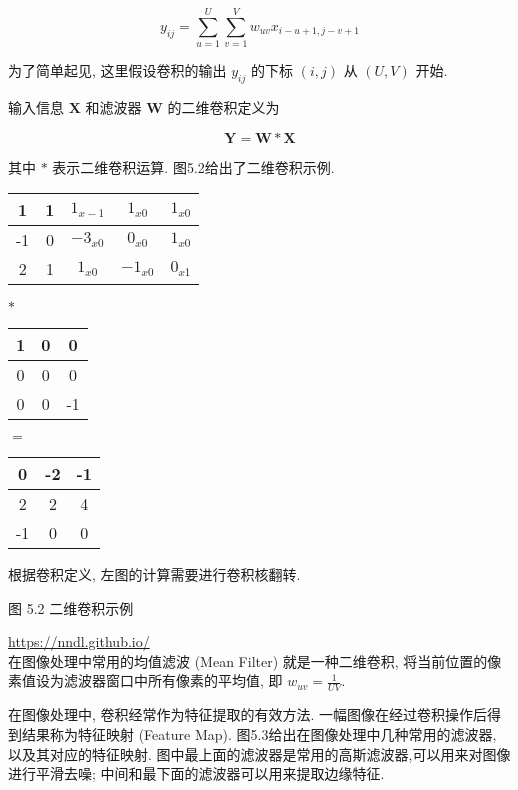 \documentclass[10pt]{article}
\begin{document}
\begin{equation*}
y_{i j}=\sum_{u=1}^{U} \sum_{v=1}^{V} w_{u v} x_{i-u+1, j-v+1} \tag{5.7}
\end{equation*}


为了简单起见, 这里假设卷积的输出 $y_{i j}$ 的下标 $(i, j)$ 从 $(U, V)$ 开始.

输入信息 $\boldsymbol{X}$ 和滤波器 $\boldsymbol{W}$ 的二维卷积定义为


\begin{equation*}
\boldsymbol{Y}=\boldsymbol{W} * \boldsymbol{X} \tag{5.8}
\end{equation*}


其中 $*$ 表示二维卷积运算. 图5.2给出了二维卷积示例.

\begin{center}
\begin{tabular}{|c|c|c|c|c|}
\hline
1 & 1 & $1_{x-1}$ & $1_{x 0}$ & $1_{x 0}$ \\
\hline
-1 & 0 & $-3_{x 0}$ & $0_{x 0}$ & $1_{x 0}$ \\
\hline
2 & 1 & $1_{x 0}$ & $-1_{x 0}$ & $0_{x 1}$ \\
\hline
\end{tabular}
\end{center}$*$

\begin{center}
\begin{tabular}{|c|c|c|}
\hline
1 & 0 & 0 \\
\hline
0 & 0 & 0 \\
\hline
0 & 0 & -1 \\
\hline
\end{tabular}
\end{center}$=$\begin{tabular}{|c|c|c|}
\hline
0 & -2 & -1 \\
\hline
2 & 2 & 4 \\
\hline
-1 & 0 & 0 \\
\hline
\end{tabular}

根据卷积定义, 左图的计算需要进行卷积核翻转.

图 5.2 二维卷积示例

\href{https://nndl.github.io/}{https://nndl.github.io/}\\
在图像处理中常用的均值滤波 (Mean Filter) 就是一种二维卷积, 将当前位置的像素值设为滤波器窗口中所有像素的平均值, 即 $w_{u v}=\frac{1}{U V}$.

在图像处理中, 卷积经常作为特征提取的有效方法. 一幅图像在经过卷积操作后得到结果称为特征映射 (Feature Map). 图5.3给出在图像处理中几种常用的滤波器, 以及其对应的特征映射. 图中最上面的滤波器是常用的高斯滤波器,可以用来对图像进行平滑去噪; 中间和最下面的滤波器可以用来提取边缘特征.\\
\end{document}
